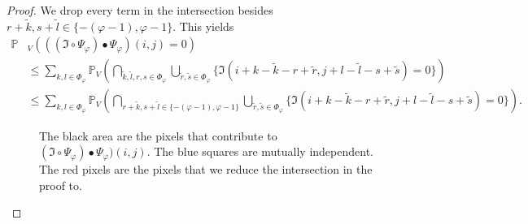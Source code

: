 \documentclass[a4paper,12pt]{article}
\theoremstyle{plain}
\theoremstyle{definition}
\begin{document}
\begin{appendix}
\begin{proof}
		We drop every term in the intersection besides $r + \tilde{k}, s + \tilde{l} \in \{ - ( \varphi - 1 ), \varphi - 1 \}$. This yields
		\begin{align*}
			\mathbb{P}&_V\left( ((\mathfrak{I} \circ \Psi_\varphi) \bullet \Psi_\varphi)(i, j) = 0 \right) \\
			&\leq \sum_{k, l \in \Phi_\varphi} \mathbb{P}_V\left( \bigcap_{\tilde{k}, \tilde{l}, r, s \in \Phi_\varphi} \bigcup_{\tilde{r}, \tilde{s} \in \Phi_\varphi} \{ \mathfrak{I}(i + k - \tilde{k} - r + \tilde{r}, j + l - \tilde{l} - s + \tilde{s}) = 0 \} \right) \\
			&\leq \sum_{k, l \in \Phi_\varphi} \mathbb{P}_V\left( \bigcap_{r + \tilde{k}, s + \tilde{l} \in \{ - ( \varphi - 1 ), \varphi - 1 \}} \bigcup_{\tilde{r}, \tilde{s} \in \Phi_\varphi} \{ \mathfrak{I}(i + k - \tilde{k} - r + \tilde{r}, j + l - \tilde{l} - s + \tilde{s}) = 0 \} \right).
		\end{align*}
		
		\begin{figure}[t!]
			\centering
			\caption{The black area are the pixels that contribute to $(\mathfrak{I} \circ \Psi_\varphi) \bullet \Psi_\varphi)(i, j)$. The blue squares are mutually independent. The red pixels are the pixels that we reduce the intersection in the proof to.}
			\label{fig: powerindependentpoints}
		\end{figure}
		

\end{proof}
\end{appendix}
\end{document}
